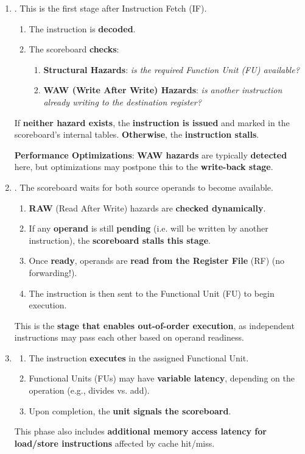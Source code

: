 \begin{enumerate}
    \item {}. This is the first stage after Instruction Fetch (IF).
    \begin{enumerate}
        \item The instruction is \textbf{decoded}.
        \item The scoreboard \textbf{checks}:
        \begin{enumerate}
            \item \textbf{Structural Hazards}: \emph{is the required Function Unit (FU) available?}
            \item \textbf{WAW (Write After Write) Hazards}: \emph{is another instruction already writing to the destination register?}
        \end{enumerate}
    \end{enumerate}
    If \textbf{neither hazard exists}, the \textbf{instruction is issued} and marked in the scoreboard's internal tables. \textbf{Otherwise}, the \textbf{instruction stalls}.

    \textcolor{Green3}{\faIcon{\speedIcon} \textbf{Performance Optimizations}}: \textbf{WAW hazards} are typically \textbf{detected} here, but optimizations may postpone this to the \textbf{write-back stage}.


    \newpage


    \item {}. The scoreboard waits for both source operands to become available.
    \begin{enumerate}
        \item \textbf{RAW} (Read After Write) hazards are \textbf{checked dynamically}.
        \item If any \textbf{operand} is still \textbf{pending} (i.e. will be written by another instruction), the \textbf{scoreboard stalls this stage}.
        \item Once \textbf{ready}, operands are \textbf{read from the Register File} (RF) (no forwarding!).
        \item The instruction is then sent to the Functional Unit (FU) to begin execution.
    \end{enumerate}
    This is the \textbf{stage that enables out-of-order execution}, as independent instructions may pass each other based on operand readiness.


    \item {}
    \begin{enumerate}
        \item The instruction \textbf{executes} in the assigned Functional Unit.
        \item Functional Units (FUs) may have \textbf{variable latency}, depending on the operation (e.g., divides vs. add).
        \item Upon completion, the \textbf{unit signals the scoreboard}.
    \end{enumerate}
    This phase also includes \textbf{additional memory access latency for load/store instructions} affected by cache hit/miss.



\end{enumerate}
